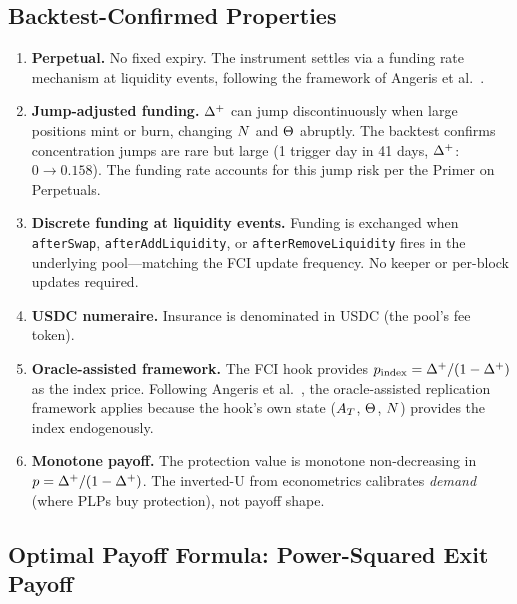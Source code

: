 \subsection{Backtest-Confirmed Properties}

\begin{enumerate}
  \item \textbf{Perpetual.} No fixed expiry. The instrument settles via a funding rate mechanism
    at liquidity events, following the framework of Angeris et al.\ \cite{angeris2022perpetuals}.

  \item \textbf{Jump-adjusted funding.} $\Delta^{+}$ can jump discontinuously when large positions
    mint or burn, changing $N$ and $\Theta$ abruptly. The backtest confirms
    concentration jumps are rare but large (1 trigger day in 41 days, $\Delta^{+}$: $0 \to 0.158$).
    The funding rate accounts for this jump risk per the Primer on Perpetuals.

  \item \textbf{Discrete funding at liquidity events.} Funding is exchanged when
    \texttt{afterSwap}, \texttt{afterAddLiquidity}, or \texttt{afterRemoveLiquidity}
    fires in the underlying pool---matching the FCI update frequency.
    No keeper or per-block updates required.

  \item \textbf{USDC numeraire.} Insurance is denominated in USDC (the pool's fee token).

  \item \textbf{Oracle-assisted framework.} The FCI hook provides $p_{\text{index}} = \Delta^{+}/(1-\Delta^{+})$
    as the index price. Following Angeris et al.\ \cite{angeris2021replicating}, the oracle-assisted
    replication framework applies because the hook's own state
    ($A_T$, $\Theta$, $N$) provides the index endogenously.

  \item \textbf{Monotone payoff.} The protection value is monotone non-decreasing in
    $p = \Delta^{+}/(1-\Delta^{+})$. The inverted-U from econometrics calibrates
    \emph{demand} (where PLPs buy protection), not payoff shape.
\end{enumerate}

\subsection{Optimal Payoff Formula: Power-Squared Exit Payoff}\label{subsec:optimal-payoff}

